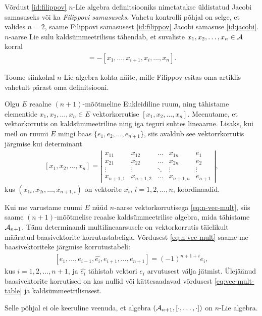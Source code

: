 Võrdust \eqref{id:filippov} $n$-Lie algebra definitsiooniks
nimetatakse üldistatud Jacobi samasuseks või ka
\emph{Filippovi samasuseks}. Vahetu kontrolli põhjal
on selge, et valides $n = 2$, saame Filippovi samasusest
\eqref{id:filippov} Jacobi samasuse \eqref{id:jacobi}.
$n$-aarse Lie sulu kaldsümmeetrilisus tähendab, et
suvaliste $x_1, x_2, \dots, x_n \in \mathcal{A}$ korral
\begin{align*}
    [x_1, \dots, x_i, x_{i+1}, \dots, x_n] =
    -[x_1, \dots, x_{i+1}, x_i, \dots, x_n].
\end{align*}

Toome siinkohal $n$-Lie algebra kohta näite, mille
Filippov esitas oma artiklis \cite{filippov1985} vahetult
pärast oma definitsiooni.

\begin{naide}
    Olgu $E$ reaalne $(n+1)$-mõõtmeline Eukleidiline ruum,
    ning tähistame elementide $x_1, x_2, \dots, x_n \in E$
    vektorkorrutise $[x_1, x_2, \dots, x_n]$. Meenutame, 
    et vektorkorrutis on kaldsümmeetriline ning iga teguri
    suhtes lineaarne. Lisaks, kui meil on ruumi $E$ mingi
    baas $\{e_1, e_2, \dots, e_{n+1}\}$, siis avaldub see
    vektorrkorrutis järgmise kui determinant
    \begin{align}\label{eq:n-vec-mult}
        [x_1, x_2, \dots, x_n] = \left|\begin{matrix}
          x_{11}    & x_{12}    & \dots  & x_{1n}    & e_1    \\
          x_{21}    & x_{22}    & \dots  & x_{2n}    & e_2    \\
          \vdots    & \vdots    & \ddots & \vdots    & \vdots \\
          x_{n+1,1} & x_{n+1,2} & \dots  & x_{n+1,n} & e_{n+1}
        \end{matrix}\right|,
    \end{align}
    kus $(x_{1i}, x_{2i}, \dots, x_{n+1,i})$ on vektorite
    $x_i$, $i = 1, 2, \dots, n$, koordinaadid.

    Kui me varustame ruumi $E$ nüüd $n$-aarse vektorkorrutisega
    \eqref{eq:n-vec-mult}, siis saame $(n+1)$-mõõtmelise
    reaalse kaldsümmeetrilise algebra, mida tähistame
    $\mathcal{A}_{n+1}$. Tänu determinandi multilineaarsusele on
    vektorkorrutis täielikult määratud baasivektorite
    korrutustabeliga. Võrdusest \eqref{eq:n-vec-mult} saame
    me baasivektoriteke järgmise korrutustabeli:
    \begin{align}\label{eq:vec-mult-table}
        [e_1, \dots, e_{i-1}, \hat{e_i}, e_{i+1}, \dots, e_{n+1}]
        = (-1)^{n+1+i} e_i,
    \end{align}
    kus $i = 1, 2, \dots, n+1$, ja $\hat{e_i}$ tähistab
    vektori $e_i$ arvutusest välja jätmist. Ülejäänud
    baasivektorite korrutised on kas nullid või kättesaadavad
    võrdusest \eqref{eq:vec-mult-table} ja
    kaldsümmeetrilisusest.

    Selle põhjal ei ole keeruline veenuda, et algebra
    $(\mathcal{A}_{n+1}, [\cdot, \dots, \cdot])$ on $n$-Lie algebra.
\end{naide}

